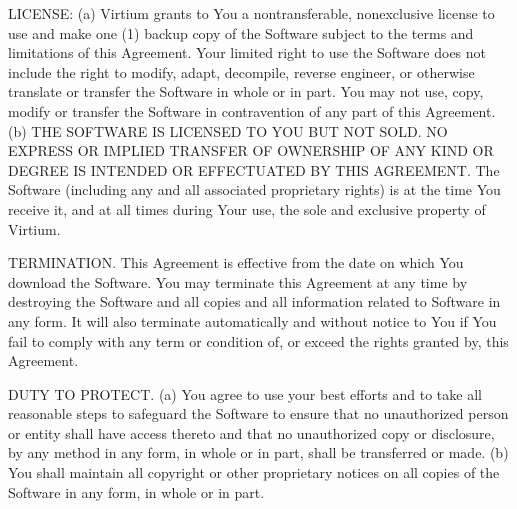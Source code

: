 \begin{DoxyEnumerate}
\item L\+I\+C\+E\+N\+SE\+: (a) Virtium grants to You a nontransferable, nonexclusive license to use and make one (1) backup copy of the Software subject to the terms and limitations of this Agreement. Your limited right to use the Software does not include the right to modify, adapt, decompile, reverse engineer, or otherwise translate or transfer the Software in whole or in part. You may not use, copy, modify or transfer the Software in contravention of any part of this Agreement. (b) T\+HE S\+O\+F\+T\+W\+A\+RE IS L\+I\+C\+E\+N\+S\+ED TO Y\+OU B\+UT N\+OT S\+O\+LD. NO E\+X\+P\+R\+E\+SS OR I\+M\+P\+L\+I\+ED T\+R\+A\+N\+S\+F\+ER OF O\+W\+N\+E\+R\+S\+H\+IP OF A\+NY K\+I\+ND OR D\+E\+G\+R\+EE IS I\+N\+T\+E\+N\+D\+ED OR E\+F\+F\+E\+C\+T\+U\+A\+T\+ED BY T\+H\+IS A\+G\+R\+E\+E\+M\+E\+NT. The Software (including any and all associated proprietary rights) is at the time You receive it, and at all times during Your use, the sole and exclusive property of Virtium.
\item T\+E\+R\+M\+I\+N\+A\+T\+I\+ON. This Agreement is effective from the date on which You download the Software. You may terminate this Agreement at any time by destroying the Software and all copies and all information related to Software in any form. It will also terminate automatically and without notice to You if You fail to comply with any term or condition of, or exceed the rights granted by, this Agreement.
\item D\+U\+TY TO P\+R\+O\+T\+E\+CT. (a) You agree to use your best efforts and to take all reasonable steps to safeguard the Software to ensure that no unauthorized person or entity shall have access thereto and that no unauthorized copy or disclosure, by any method in any form, in whole or in part, shall be transferred or made. (b) You shall maintain all copyright or other proprietary notices on all copies of the Software in any form, in whole or in part.

\end{DoxyEnumerate}
